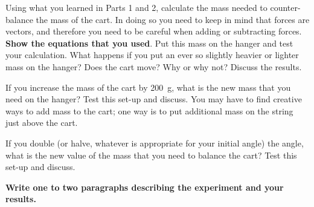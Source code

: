 \documentclass[11pt,letterpaper]{article}
\begin{document}
Using what you learned in Parts 1 and 2, calculate the mass needed to counter-balance the mass of the cart. In doing so you need to keep in mind that forces are vectors, and therefore you need to be careful when adding or subtracting forces. \textbf{Show the equations that you used}. Put this mass on the hanger and test your calculation. What happens if you put an ever so slightly heavier or lighter mass on the hanger? Does the cart move? Why or why not? Discuss the results.

If you increase the mass of the cart by 200~g, what is the new mass that you need on the hanger?  Test this set-up and discuss. You may have to find creative ways to add mass to the cart; one way is to put additional mass on the string just above the cart.

If you double (or halve, whatever is appropriate for your initial
angle) the angle, what is the new value of the mass that you need to balance the cart?  Test this set-up and discuss.
 
\textbf{Write one to two paragraphs describing the experiment and your results.}


\end{document}

